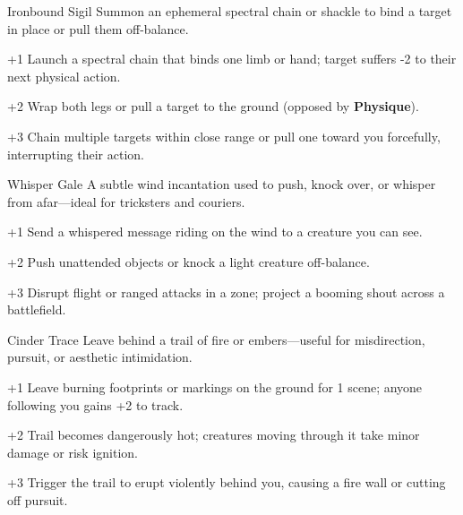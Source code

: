 \begin{WyrdSpell}[Conjuration]{Ironbound Sigil}
    Summon an ephemeral spectral chain or shackle to bind a target in place or pull them off-balance.

    \begin{WyrdSpellBlock}
        \item[+1] Launch a spectral chain that binds one limb or hand; target suffers -2 to their next physical action.
        \item[+2] Wrap both legs or pull a target to the ground (opposed by \textbf{Physique}).
        \item[+3] Chain multiple targets within close range or pull one toward you forcefully, interrupting their action.
    \end{WyrdSpellBlock}
\end{WyrdSpell}

\begin{WyrdSpell}[Elemental]{Whisper Gale}
    A subtle wind incantation used to push, knock over, or whisper from afar—ideal for tricksters and couriers.

    \begin{WyrdSpellBlock}
        \item[+1] Send a whispered message riding on the wind to a creature you can see.
        \item[+2] Push unattended objects or knock a light creature off-balance.
        \item[+3] Disrupt flight or ranged attacks in a zone; project a booming shout across a battlefield.
    \end{WyrdSpellBlock}
\end{WyrdSpell}

\begin{WyrdSpell}[Elemental]{Cinder Trace}
    Leave behind a trail of fire or embers—useful for misdirection, pursuit, or aesthetic intimidation.

    \begin{WyrdSpellBlock}
        \item[+1] Leave burning footprints or markings on the ground for 1 scene; anyone following you gains +2 to track.
        \item[+2] Trail becomes dangerously hot; creatures moving through it take minor damage or risk ignition.
        \item[+3] Trigger the trail to erupt violently behind you, causing a fire wall or cutting off pursuit.
    \end{WyrdSpellBlock}
\end{WyrdSpell}

